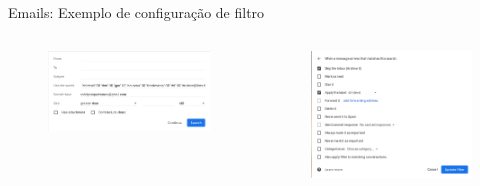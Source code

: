 \documentclass[10pt, compress, aspectratio=169]{beamer}
\begin{document}
\begin{frame}{Emails: Exemplo de configuração de filtro}
  \begin{columns}[T]
    \begin{column}{.4\textwidth}
      \begin{figure}
        \centering
        \includegraphics[width=\linewidth,
                       height=0.7\textheight,
                       keepaspectratio]{conf_filter_1}
      \end{figure}
    \end{column}

    \hfill
    \begin{column}{.5\textwidth}
      \begin{figure}
        \centering
        \includegraphics[width=\linewidth,
                         height=0.6\textheight,
                         keepaspectratio]{conf_filter_2}
      \end{figure}
   \end{column}
  \end{columns}

\end{frame}
\end{document}
